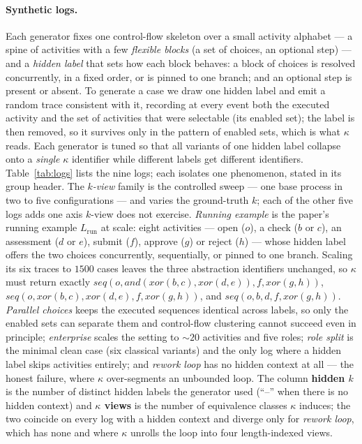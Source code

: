 \documentclass[10pt]{article}
\begin{document}
\paragraph{Synthetic logs.}
Each generator fixes one control-flow skeleton over a small activity alphabet --- a spine of activities with a few \emph{flexible blocks} (a set of choices, an optional step) --- and a \emph{hidden label} that sets how each block behaves: a block of choices is resolved concurrently, in a fixed order, or is pinned to one branch; and an optional step is present or absent.
To generate a case we draw one hidden label and emit a random trace consistent with it, recording at every event both the executed activity and the set of activities that were selectable (its enabled set); the label is then removed, so it survives only in the pattern of enabled sets, which is what $\kappa$ reads.
Each generator is tuned so that all variants of one hidden label collapse onto a \emph{single} $\kappa$ identifier while different labels get different identifiers.
Table~\ref{tab:logs} lists the nine logs; each isolates one phenomenon, stated in its group header.
The \emph{$k$-view} family is the controlled sweep --- one base process in two to five configurations --- and varies the ground-truth $k$; each of the other five logs adds one axis $k$-view does not exercise.
\emph{Running example} is the paper's running example $L_{\mathrm{run}}$ at scale: eight activities --- open ($o$), a check ($b$ or $c$), an assessment ($d$ or $e$), submit ($f$), approve ($g$) or reject ($h$) --- whose hidden label offers the two choices concurrently, sequentially, or pinned to one branch.
Scaling its six traces to $1500$ cases leaves the three abstraction identifiers unchanged, so $\kappa$ must return exactly $\mathit{seq}(o,\mathit{and}(\mathit{xor}(b,c),\mathit{xor}(d,e)),f,\mathit{xor}(g,h))$, $\mathit{seq}(o,\mathit{xor}(b,c),\mathit{xor}(d,e),f,\mathit{xor}(g,h))$, and $\mathit{seq}(o,b,d,f,\mathit{xor}(g,h))$.
\emph{Parallel choices} keeps the executed sequences identical across labels, so only the enabled sets can separate them and control-flow clustering cannot succeed even in principle; \emph{enterprise} scales the setting to ${\sim}20$ activities and five roles; \emph{role split} is the minimal clean case (six classical variants) and the only log where a hidden label skips activities entirely; and \emph{rework loop} has no hidden context at all --- the honest failure, where $\kappa$ over-segments an unbounded loop.
The column \textbf{hidden $k$} is the number of distinct hidden labels the generator used (``--'' when there is no hidden context) and \textbf{$\kappa$ views} is the number of equivalence classes $\kappa$ induces; the two coincide on every log with a hidden context and diverge only for \emph{rework loop}, which has none and where $\kappa$ unrolls the loop into four length-indexed views.
\end{document}
